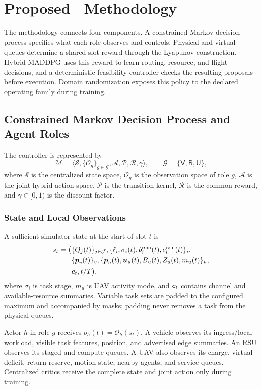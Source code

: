 \section{Proposed \method\ Methodology}
The methodology connects four components. A constrained Markov decision
process specifies what each role observes and controls. Physical and virtual
queues determine a shared slot reward through the Lyapunov construction.
Hybrid MADDPG uses this reward to learn routing, resource, and flight
decisions, and a deterministic feasibility controller checks the resulting
proposals before execution. Domain randomization exposes this policy to the
declared operating family during training.

\subsection{Constrained Markov Decision Process and Agent Roles}
The controller is represented by
\begin{equation}
\mathcal M=\langle\mathcal S,\{\mathcal O_g\}_{g\in\mathcal G},
\mathcal A,\mathcal P,\mathcal R,\gamma\rangle,
\qquad \mathcal G=\{\mathsf V,\mathsf R,\mathsf U\},
\label{eq:cmdp}
\end{equation}
where $\mathcal S$ is the centralized state space, $\mathcal O_g$ is the
observation space of role $g$, $\mathcal A$ is the joint hybrid action space,
$\mathcal P$ is the transition kernel, $\mathcal R$ is the common reward, and
$\gamma\in[0,1)$ is the discount factor.

\subsubsection{State and Local Observations}
A sufficient simulator state at the start of slot $t$ is
\begin{align}
s_t=\big(&\{Q_j(t)\}_{j\in\mathcal J},
\{\ell_i,\sigma_i(t),b_i^{\rm rem}(t),
c_i^{\rm rem}(t)\}_i,\nonumber\\
&\{\boldsymbol{p}_v(t)\}_v,
\{\boldsymbol{p}_u(t),\boldsymbol{u}_u(t),B_u(t),Z_u(t),m_u(t)\}_u,\nonumber\\
&
\boldsymbol{c}_t,t/T\big),
\label{eq:method_state}
\end{align}
where $\sigma_i$ is task stage, $m_u$ is UAV activity mode, and $\boldsymbol{c}_t$
contains channel and available-resource summaries. Variable task sets are
padded to the configured maximum and accompanied by masks; padding never
removes a task from the physical queues.

Actor $h$ in role $g$ receives $o_h(t)=\mathcal O_h(s_t)$. A vehicle observes
its ingress/local workload, visible task features, position, and advertised
edge summaries. An RSU observes its staged and compute queues. A UAV also
observes its charge, virtual deficit, return reserve, motion state, nearby
agents, and service queues. Centralized critics receive the complete state and
joint action only during training.

